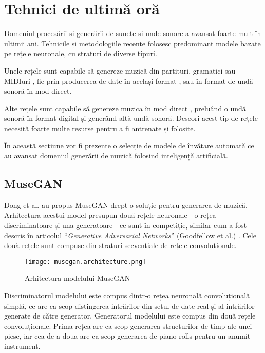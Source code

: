 \chapter{Tehnici de ultimă oră}

Domeniul procesării și generării de sunete și unde sonore a avansat foarte mult în ultimii ani. Tehnicile și metodologiile recente folosesc predominant modele bazate pe rețele neuronale, cu straturi de diverse tipuri.

Unele rețele sunt capabile să genereze muzică din partituri, gramatici sau MIDIuri \cite{dong2017museganmultitracksequentialgenerative}, fie prin producerea de date în același format \cite{dong2017museganmultitracksequentialgenerative}, sau în format de undă sonoră în mod direct.

Alte rețele sunt capabile să genereze muzica în mod direct \cite{li2025jen1textguideduniversalmusic}, preluând o undă sonoră în format digital și generând altă undă sonoră. Deseori acest tip de rețele necesită foarte multe resurse pentru a fi antrenate și folosite.

În această secțiune vor fi prezente o selecție de modele de învățare automată ce au avansat domeniul generării de muzică folosind inteligență artificială.

\section{MuseGAN}

Dong et al. au propus MuseGAN \cite{dong2017museganmultitracksequentialgenerative} drept o soluție pentru generarea de muzică. Arhitectura acestui model presupun două rețele neuronale - o rețea discriminatoare și una generatoare - ce sunt în competiție, similar cum a fost descris în articolul ``\textit{Generative Adversarial Networks}'' (Goodfellow et al.) \cite{goodfellow2014generativeadversarialnetworks}. Cele două rețele sunt compuse din straturi secvențiale de rețele convoluționale. 

\begin{figure}[H]
    \centering
    \texttt{[image: musegan.architecture.png]}
    \caption{Arhitectura modelului MuseGAN}
    \label{musegan-architecture}
\end{figure}

Discriminatorul modelului este compus dintr-o rețea neuronală convoluțională simplă, ce are ca scop distingerea intrărilor din setul de date real și al intrărilor generate de către generator. Generatorul modelului este compus din două rețele convoluționale. Prima rețea are ca scop generarea structurilor de timp ale unei piese, iar cea de-a doua are ca scop generarea de piano-rolls pentru un anumit instrument.

